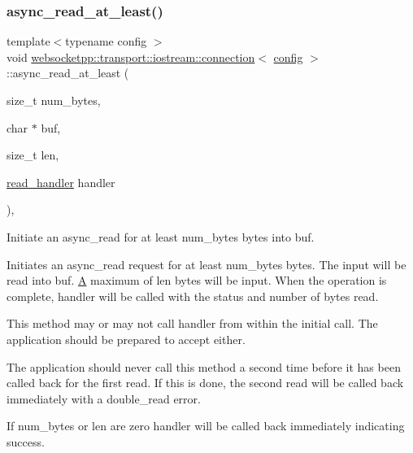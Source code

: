 \subsubsection{\texorpdfstring{async\+\_\+read\+\_\+at\+\_\+least()}{async\_read\_at\_least()}}
{\footnotesize\ttfamily template$<$typename config $>$ \\
void \mbox{\hyperlink{classwebsocketpp_1_1transport_1_1iostream_1_1connection}{websocketpp\+::transport\+::iostream\+::connection}}$<$ \mbox{\hyperlink{classconfig}{config}} $>$\+::async\+\_\+read\+\_\+at\+\_\+least (\begin{DoxyParamCaption}\item[{size\+\_\+t}]{num\+\_\+bytes,  }\item[{char $\ast$}]{buf,  }\item[{size\+\_\+t}]{len,  }\item[{\mbox{\hyperlink{namespacewebsocketpp_1_1transport_a3a9b2ed54dfcc6ebe7d7e6b4c02f53fb}{read\+\_\+handler}}}]{handler }\end{DoxyParamCaption})\hspace{0.3cm}{\ttfamily [inline]}, {\ttfamily [protected]}}



Initiate an async\+\_\+read for at least num\+\_\+bytes bytes into buf. 

Initiates an async\+\_\+read request for at least num\+\_\+bytes bytes. The input will be read into buf. \mbox{\hyperlink{struct_a}{A}} maximum of len bytes will be input. When the operation is complete, handler will be called with the status and number of bytes read.

This method may or may not call handler from within the initial call. The application should be prepared to accept either.

The application should never call this method a second time before it has been called back for the first read. If this is done, the second read will be called back immediately with a double\+\_\+read error.

If num\+\_\+bytes or len are zero handler will be called back immediately indicating success.


